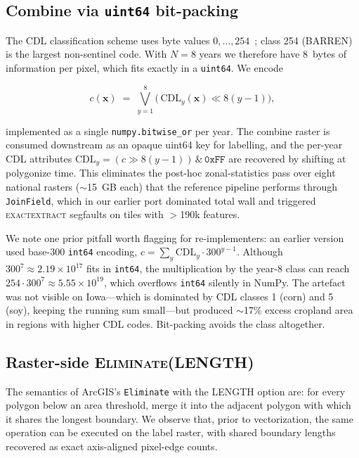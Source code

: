 \documentclass{article}
\begin{document}
\subsection{Combine via \texttt{uint64} bit-packing}
\label{sec:method-combine}

The CDL classification scheme uses byte values
$0,\ldots,254$~\citep{boryan2011cdl}; class 254 (BARREN) is the largest
non-sentinel code. With $N=8$ years we therefore have 8~bytes of
information per pixel, which fits exactly in a \texttt{uint64}. We
encode

\[
c(\mathbf{x}) \;=\; \bigvee_{y=1}^{8} \bigl(\,\text{CDL}_y(\mathbf{x}) \ll 8(y-1)\bigr),
\]

implemented as a single \texttt{numpy.bitwise\_or} per year. The
combine raster is consumed downstream as an opaque uint64 key for
labelling, and the per-year CDL attributes
$\text{CDL}_y = (c \gg 8(y-1)) \,\&\, \mathtt{0xFF}$ are recovered by
shifting at polygonize time. This eliminates the post-hoc
zonal-statistics pass over eight national rasters ($\sim$15~GB each)
that the reference pipeline performs through \texttt{JoinField}, which
in our earlier port dominated total wall and triggered
\textsc{exactextract} segfaults on tiles with $>$190k features.

We note one prior pitfall worth flagging for re-implementers: an
earlier version used base-$300$ \texttt{int64} encoding,
$c = \sum_y \text{CDL}_y \cdot 300^{y-1}$. Although $300^7 \approx
2.19 \times 10^{17}$ fits in \texttt{int64}, the multiplication by
the year-8 class can reach $254 \cdot 300^7 \approx 5.55 \times 10^{19}$,
which overflows \texttt{int64} silently in NumPy. The artefact was
not visible on Iowa---which is dominated by CDL classes 1 (corn) and 5
(soy), keeping the running sum small---but produced $\sim$17\% excess
cropland area in regions with higher CDL codes. Bit-packing avoids the
class altogether.

\subsection{Raster-side \textsc{Eliminate(LENGTH)}}
\label{sec:method-eliminate}

The semantics of ArcGIS's \texttt{Eliminate} with the
\textsc{LENGTH} option are: for every polygon below an area threshold,
merge it into the adjacent polygon with which it shares the longest
boundary. We observe that, prior to vectorization, the same operation
can be executed on the label raster, with shared boundary lengths
recovered as exact axis-aligned pixel-edge counts.
\end{document}
